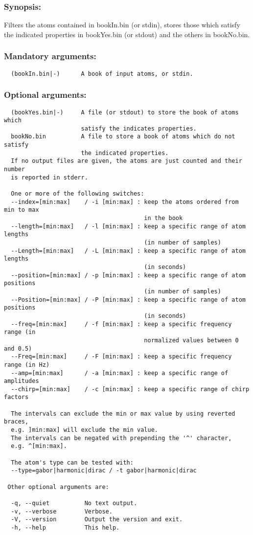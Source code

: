 \documentclass[11pt,a4paper]{article}
\begin{document}
\subsubsection*{Synopsis:}
Filters the atoms contained in bookIn.bin (or stdin), stores those which
satisfy the indicated properties in bookYes.bin (or stdout) and the others in
bookNo.bin.

\subsubsection*{Mandatory arguments:}
\begin{verbatim}
  (bookIn.bin|-)      A book of input atoms, or stdin.
\end{verbatim}

\subsubsection*{Optional arguments:}
\begin{verbatim}
  (bookYes.bin|-)     A file (or stdout) to store the book of atoms which
                      satisfy the indicates properties.
  bookNo.bin          A file to store a book of atoms which do not satisfy
                      the indicated properties.
  If no output files are given, the atoms are just counted and their number
  is reported in stderr.

  One or more of the following switches:
  --index=[min:max]    / -i [min:max] : keep the atoms ordered from min to max
                                        in the book
  --length=[min:max]   / -l [min:max] : keep a specific range of atom lengths
                                        (in number of samples)
  --Length=[min:max]   / -L [min:max] : keep a specific range of atom lengths
                                        (in seconds)
  --position=[min:max] / -p [min:max] : keep a specific range of atom positions
                                        (in number of samples)
  --Position=[min:max] / -P [min:max] : keep a specific range of atom positions
                                        (in seconds)
  --freq=[min:max]     / -f [min:max] : keep a specific frequency range (in
                                        normalized values between 0 and 0.5)
  --Freq=[min:max]     / -F [min:max] : keep a specific frequency range (in Hz)
  --amp=[min:max]      / -a [min:max] : keep a specific range of amplitudes
  --chirp=[min:max]    / -c [min:max] : keep a specific range of chirp factors

  The intervals can exclude the min or max value by using reverted braces,
  e.g. ]min:max] will exclude the min value.
  The intervals can be negated with prepending the '^' character,
  e.g. ^[min:max].

  The atom's type can be tested with:
  --type=gabor|harmonic|dirac / -t gabor|harmonic|dirac

 Other optional arguments are:

  -q, --quiet          No text output.
  -v, --verbose        Verbose.
  -V, --version        Output the version and exit.
  -h, --help           This help.
\end{verbatim}
\end{document}
